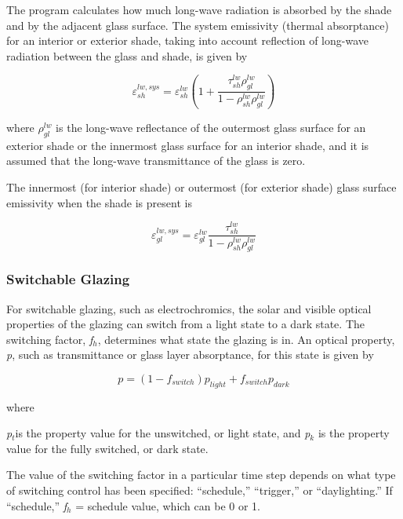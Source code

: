 The program calculates how much long-wave radiation is absorbed by the shade and by the adjacent glass surface. The system emissivity (thermal absorptance) for an interior or exterior shade, taking into account reflection of long-wave radiation between the glass and shade, is given by

\begin{equation}
\varepsilon_{sh}^{lw,sys} = \varepsilon_{sh}^{lw}\left( {1 + \frac{{\tau_{sh}^{lw}\rho_{gl}^{lw}}}{{1 - \rho_{sh}^{lw}\rho_{gl}^{lw}}}} \right)
\end{equation}

where \(\rho_{gl}^{lw}\) is the long-wave reflectance of the outermost glass surface for an exterior shade or the innermost glass surface for an interior shade, and it is assumed that the long-wave transmittance of the glass is zero.

The innermost (for interior shade) or outermost (for exterior shade) glass surface emissivity when the shade is present is

\begin{equation}
\varepsilon_{gl}^{lw,sys} = \varepsilon_{gl}^{lw}\frac{{\tau_{sh}^{lw}}}{{1 - \rho_{sh}^{lw}\rho_{gl}^{lw}}}
\end{equation}

\subsubsection{Switchable Glazing}\label{switchable-glazing}

For switchable glazing, such as electrochromics, the solar and visible optical properties of the glazing can switch from a light state to a dark state. The switching factor, \emph{f\(_{h}\)}, determines what state the glazing is in. An optical property, \emph{p}, such as transmittance or glass layer absorptance, for this state is given by

\begin{equation}
p = (1 - {f_{switch}}){p_{light}} + {f_{switch}}{p_{dark}}
\end{equation}

where

\emph{p\(_{t}\)}is the property value for the unswitched, or light state, and \emph{p\(_{k}\)} is the property value for the fully switched, or dark state.

The value of the switching factor in a particular time step depends on what type of switching control has been specified: ``schedule,'' ``trigger,'' or ``daylighting.'' If ``schedule,'' \emph{f\(_{h}\)} = schedule value, which can be 0 or 1.

